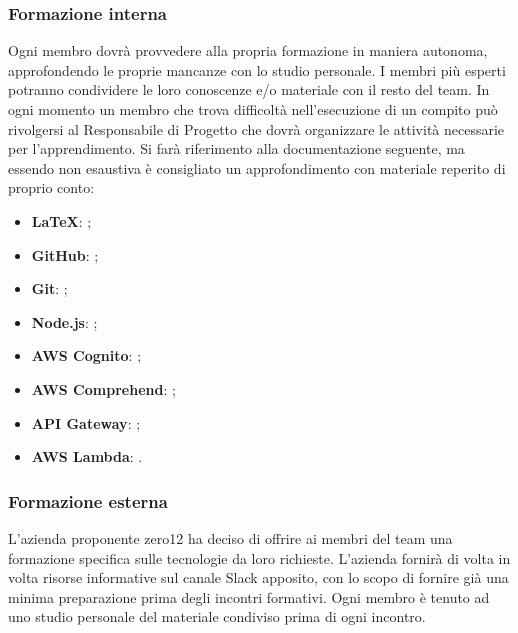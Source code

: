 \subsubsection{Formazione interna}
Ogni membro dovrà provvedere alla propria formazione in maniera autonoma, approfondendo le proprie mancanze con lo studio personale. I membri più esperti potranno condividere le loro conoscenze e/o materiale con il resto del team. In ogni momento un membro che trova difficoltà nell'esecuzione di un compito può rivolgersi al Responsabile di Progetto che dovrà organizzare le attività necessarie per l'apprendimento. Si farà riferimento alla documentazione seguente, ma essendo non esaustiva è consigliato un approfondimento con materiale reperito di proprio conto:
\begin{itemize}
\item \textbf{\LaTeX}: ;
\item \textbf{GitHub}: ;
\item \textbf{Git}: ;
\item \textbf{Node.js}: ;
\item \textbf{AWS Cognito}: ;
\item \textbf{AWS Comprehend}: ;
\item \textbf{API Gateway}: ;
\item \textbf{AWS Lambda}: .
\end{itemize}

\subsubsection{Formazione esterna}
L'azienda proponente zero12 ha deciso di offrire ai membri del team una formazione specifica sulle tecnologie da loro richieste. L'azienda fornirà di volta in volta risorse informative sul canale Slack apposito, con lo scopo di fornire già una minima preparazione prima degli incontri formativi. Ogni membro è tenuto ad uno studio personale del materiale condiviso prima di ogni incontro.


